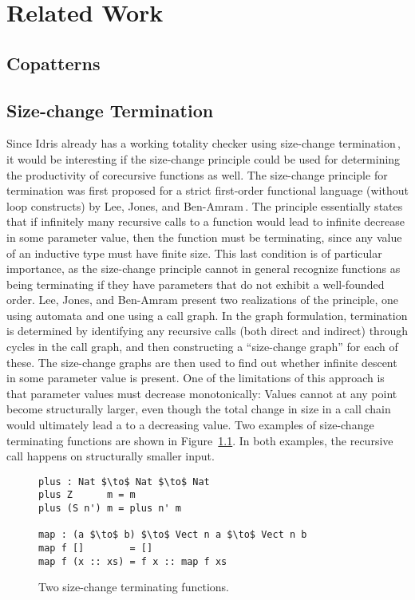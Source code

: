 \chapter{Related Work}
\label{cha:related-work}

\section{Copatterns}
\label{sec:related_work_copatterns}

\section{Size-change Termination}
Since Idris already has a working totality checker using size-change termination\,\citep{BradyIdrisImpl13}, it would be interesting if the size-change principle could be used for determining the productivity of corecursive functions as well. The size-change principle for termination was first proposed for a strict first-order functional language (without loop constructs) by Lee, Jones, and Ben-Amram\,\citep{LeeJones01SizeChange}. The principle essentially states that if infinitely many recursive calls to a function would lead to infinite decrease in some parameter value, then the function must be terminating, since any value of an inductive type must have finite size. This last condition is of particular importance, as the size-change principle cannot in general recognize functions as being terminating if they have parameters that do not exhibit a well-founded order. Lee, Jones, and Ben-Amram present two realizations of the principle, one using automata and one using a call graph. In the graph formulation, termination is determined by identifying any recursive calls (both direct and indirect) through cycles in the call graph, and then constructing a ``size-change graph'' for each of these. The size-change graphs are then used to find out whether infinite descent in some parameter value is present. One of the limitations of this approach is that parameter values must decrease monotonically: Values cannot at any point become structurally larger, even though the total change in size in a call chain would ultimately lead a to a decreasing value. Two examples of size-change terminating functions are shown in Figure~\ref{fig:sizechange_plus_map}. In both examples, the recursive call happens on structurally smaller input.

\begin{figure}
\begin{lstlisting}[mathescape]
plus : Nat $\to$ Nat $\to$ Nat
plus Z      m = m
plus (S n') m = plus n' m

map : (a $\to$ b) $\to$ Vect n a $\to$ Vect n b
map f []        = []
map f (x :: xs) = f x :: map f xs
\end{lstlisting}
\caption{Two size-change terminating functions.}
\label{fig:sizechange_plus_map}
\end{figure}

